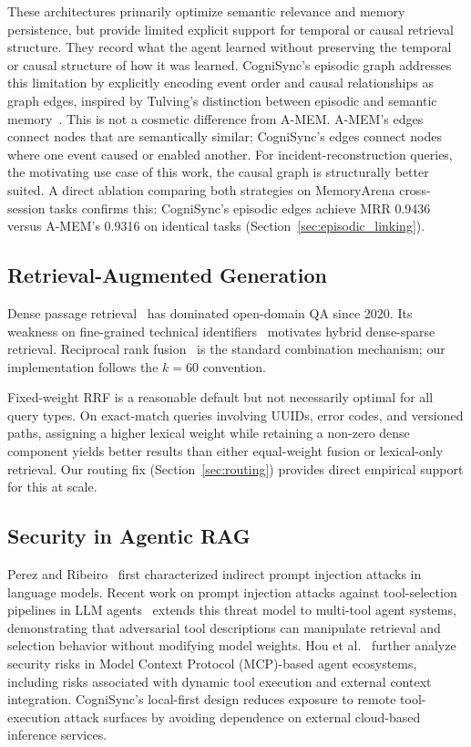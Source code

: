 \documentclass[sigconf]{acmart}
\begin{document}
These architectures primarily optimize semantic relevance and memory persistence, but provide limited explicit support for temporal or causal retrieval structure. They
record what the agent learned without preserving the temporal or causal
structure of how it was learned. CogniSync's episodic graph addresses this limitation by explicitly encoding event order and causal relationships as graph edges, inspired by Tulving's distinction between episodic and semantic memory~\cite{tulving1972}.
This is not a cosmetic difference from A-MEM. A-MEM's edges connect nodes
that are semantically similar; CogniSync's edges connect nodes where one
event caused or enabled another. For incident-reconstruction queries,
the motivating use case of this work, the causal graph is structurally
better suited. A direct ablation comparing both strategies on MemoryArena
cross-session tasks confirms this: CogniSync's episodic edges achieve
MRR 0.9436 versus A-MEM's 0.9316 on identical tasks
(Section~\ref{sec:episodic_linking}).

\subsection{Retrieval-Augmented Generation}

Dense passage retrieval~\cite{karpukhin2020dpr} has dominated open-domain
QA since 2020. Its weakness on fine-grained technical
identifiers~\cite{zhao2022dense} motivates hybrid dense-sparse retrieval.
Reciprocal rank fusion~\cite{cormack2009rrf} is the standard combination
mechanism; our implementation follows the $k{=}60$ convention.

Fixed-weight RRF is a reasonable default but not necessarily optimal for
all query types. On exact-match queries involving UUIDs, error codes, and
versioned paths, assigning a higher lexical weight while retaining a
non-zero dense component yields better results than either equal-weight
fusion or lexical-only retrieval. Our routing fix (Section~\ref{sec:routing})
provides direct empirical support for this at scale.

\subsection{Security in Agentic RAG}

Perez and Ribeiro~\cite{perez2022injection} first characterized indirect
prompt injection attacks in language models. Recent work on prompt
injection attacks against tool-selection pipelines in LLM
agents~\cite{shi2025toolhijacker} extends this threat model to
multi-tool agent systems, demonstrating that adversarial tool
descriptions can manipulate retrieval and selection behavior without
modifying model weights. Hou et al.~\cite{hou2025mcp} further analyze
security risks in Model Context Protocol (MCP)-based agent ecosystems,
including risks associated with dynamic tool execution and external
context integration. CogniSync's local-first design reduces exposure to
remote tool-execution attack surfaces by avoiding dependence on external
cloud-based inference services.
\end{document}
